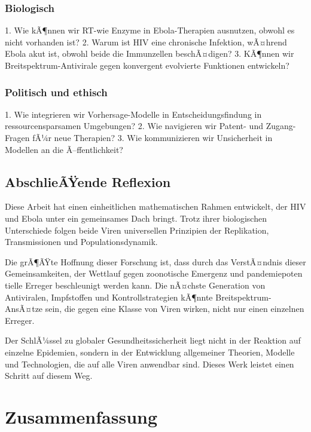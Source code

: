﻿\documentclass[a4paper,12pt]{article}
\theoremstyle{definition}
\begin{document}
\subsubsection{Biologisch}
1. Wie kÃ¶nnen wir RT-wie Enzyme in Ebola-Therapien ausnutzen, obwohl es nicht vorhanden ist?
2. Warum ist HIV eine chronische Infektion, wÃ¤hrend Ebola akut ist, obwohl beide die Immunzellen beschÃ¤digen?
3. KÃ¶nnen wir Breitspektrum-Antivirale gegen konvergent evolvierte Funktionen entwickeln?

\subsubsection{Politisch und ethisch}
1. Wie integrieren wir Vorhersage-Modelle in Entscheidungsfindung in ressourcensparsamen Umgebungen?
2. Wie navigieren wir Patent- und Zugang-Fragen fÃ¼r neue Therapien?
3. Wie kommunizieren wir Unsicherheit in Modellen an die Ã–ffentlichkeit?

\subsection{AbschlieÃŸende Reflexion}

Diese Arbeit hat einen einheitlichen mathematischen Rahmen entwickelt, der HIV und Ebola unter ein gemeinsames Dach bringt. Trotz ihrer biologischen Unterschiede folgen beide Viren universellen Prinzipien der Replikation, Transmissionen und Populationsdynamik.

Die grÃ¶ÃŸte Hoffnung dieser Forschung ist, dass durch das VerstÃ¤ndnis dieser Gemeinsamkeiten, der Wettlauf gegen zoonotische Emergenz und pandemiepoten tielle Erreger beschleunigt werden kann. Die nÃ¤chste Generation von Antiviralen, Impfstoffen und Kontrollstrategien kÃ¶nnte Breitspektrum-AnsÃ¤tze sein, die gegen eine Klasse von Viren wirken, nicht nur einen einzelnen Erreger.

Der SchlÃ¼ssel zu globaler Gesundheitssicherheit liegt nicht in der Reaktion auf einzelne Epidemien, sondern in der Entwicklung allgemeiner Theorien, Modelle und Technologien, die auf alle Viren anwendbar sind. Dieses Werk leistet einen Schritt auf diesem Weg.

\section{Zusammenfassung}
\end{document}
